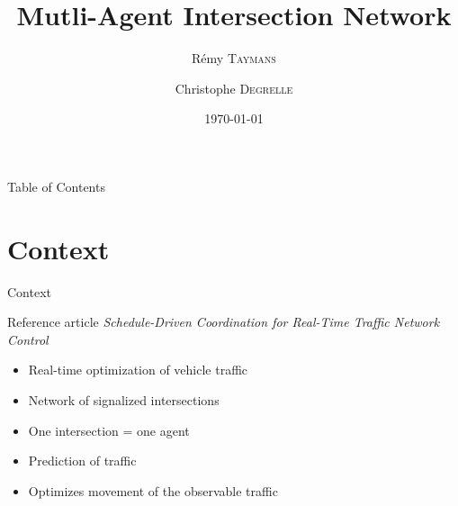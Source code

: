\documentclass[]{beamer}
\author{Rémy \textsc{Taymans} \and Christophe \textsc{Degrelle}}
\title{Mutli-Agent Intersection Network}
\institute{ECAM}
\date{\today}
\begin{document}
\begin{frame}
  \titlepage
\end{frame}

\begin{frame}{Table of Contents}
  \tableofcontents
\end{frame}

\section{Context}
\begin{frame}{Context}
\begin{block}{Reference article}
\centering
\emph{Schedule-Driven Coordination for Real-Time Traffic Network Control}
\end{block}


 \begin{itemize}
  \item Real-time optimization of vehicle traffic
  \item Network of signalized intersections
  \item One intersection = one agent
  \item Prediction of traffic
  \item Optimizes movement of the observable traffic
 \end{itemize}
\end{frame}
\end{document}
